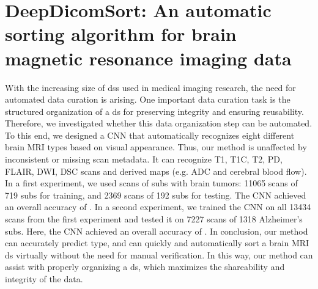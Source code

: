 
\chapter[DeepDicomSort: An automatic sorting algorithm for brain magnetic resonance imaging data][DeepDicomSort]{DeepDicomSort: An automatic sorting algorithm for brain magnetic resonance imaging data}\label{chap:DDS}
\begin{ChapterAbstract}
With the increasing size of \glspl{ds} used in medical imaging research, the need for automated data curation is arising.
One important data curation task is the structured organization of a \gls{ds} for preserving integrity and ensuring reusability.
Therefore, we investigated whether this data organization step can be automated.
To this end, we designed a \gls{CNN} that automatically recognizes eight different brain \gls{MRI} \glspl{type} based on visual appearance.
Thus, our method is unaffected by inconsistent or missing \gls{scan} metadata.
It can recognize \gls{T1}, \gls{T1C}, \gls{T2}, \gls{PD}, \gls{FLAIR}, \gls{DWI}, \gls{DSC} \glspl{scan} and derived maps (e.g. \acrlong{ADC} and cerebral blood flow).
In a first experiment, we used \glspl{scan} of \glspl{sub} with brain \glspl{tumor}: \num{11065} \glspl{scan} of \num{719} \glspl{sub} for training, and \num{2369} \glspl{scan} of \num{192} \glspl{sub} for testing.
The \gls{CNN} achieved an overall accuracy of .
In a second experiment, we trained the \gls{CNN} on all \num{13434} \glspl{scan} from the first experiment and tested it on \num{7227} \glspl{scan} of \num{1318} Alzheimer's \glspl{sub}.
Here, the \gls{CNN} achieved an overall accuracy of .
In conclusion, our method can accurately predict \gls{type}, and can quickly and automatically sort a brain \gls{MRI} \gls{ds} virtually without the need for manual verification.
In this way, our method can assist with properly organizing a \gls{ds}, which maximizes the shareability and integrity of the data.

\end{ChapterAbstract}
\setcellgapes{5pt}


\glsunset{}

